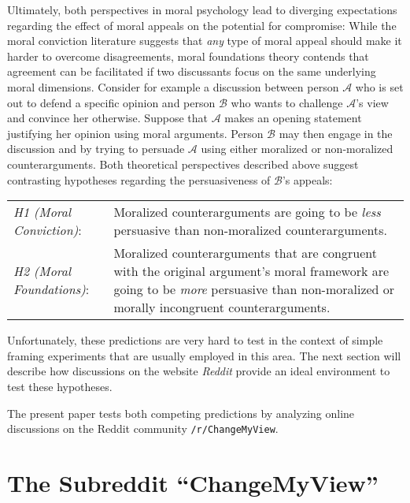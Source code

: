 Ultimately, both perspectives in moral psychology lead to diverging expectations regarding the effect of moral appeals on the potential for compromise: While the moral conviction literature suggests that \textit{any} type of moral appeal should make it harder to overcome disagreements, moral foundations theory contends that agreement can be facilitated if two discussants focus on the same underlying moral dimensions. Consider for example a discussion between person $\mathcal{A}$ who is set out to defend a specific opinion and person $\mathcal{B}$ who wants to challenge $\mathcal{A}$'s view and convince her otherwise. Suppose that $\mathcal{A}$ makes an opening statement justifying her opinion using moral arguments. Person $\mathcal{B}$ may then engage in the discussion and by trying to persuade $\mathcal{A}$ using either moralized or non-moralized counterarguments. Both theoretical perspectives described above suggest contrasting hypotheses regarding the persuasiveness of $\mathcal{B}$'s appeals:
\begin{center}\begin{tabularx}{\textwidth}{lX}
\textit{H1 (Moral Conviction)}: & Moralized counterarguments are going to be \textit{less} persuasive than non-moralized counterarguments.\\
\textit{H2 (Moral Foundations)}: & Moralized counterarguments that are congruent with the original argument's moral framework are going to be \textit{more} persuasive than non-moralized or morally incongruent counterarguments.
\end{tabularx}\end{center}

Unfortunately, these predictions are very hard to test in the context of simple framing experiments that are usually employed in this area. The next section will describe how discussions on the website \textit{Reddit} provide an ideal environment to test these hypotheses.

The present paper tests both competing predictions by analyzing online discussions on the Reddit community \texttt{/r/ChangeMyView}. 



\section{The Subreddit ``ChangeMyView''}

